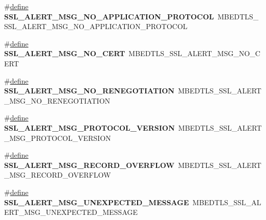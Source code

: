 \begin{DoxyCompactItemize}
\mbox{\label{compat-1_83_8h_aa2e1d7e2cad0ef4fa4b2bf05b548d69c}} 
\#\hyperlink{structdefine}{define} {\bfseries S\+S\+L\+\_\+\+A\+L\+E\+R\+T\+\_\+\+M\+S\+G\+\_\+\+N\+O\+\_\+\+A\+P\+P\+L\+I\+C\+A\+T\+I\+O\+N\+\_\+\+P\+R\+O\+T\+O\+C\+OL}~M\+B\+E\+D\+T\+L\+S\+\_\+\+S\+S\+L\+\_\+\+A\+L\+E\+R\+T\+\_\+\+M\+S\+G\+\_\+\+N\+O\+\_\+\+A\+P\+P\+L\+I\+C\+A\+T\+I\+O\+N\+\_\+\+P\+R\+O\+T\+O\+C\+OL
\item 
\mbox{\label{compat-1_83_8h_aa39058a5209b2dc80ce6ed78df88ac1e}} 
\#\hyperlink{structdefine}{define} {\bfseries S\+S\+L\+\_\+\+A\+L\+E\+R\+T\+\_\+\+M\+S\+G\+\_\+\+N\+O\+\_\+\+C\+E\+RT}~M\+B\+E\+D\+T\+L\+S\+\_\+\+S\+S\+L\+\_\+\+A\+L\+E\+R\+T\+\_\+\+M\+S\+G\+\_\+\+N\+O\+\_\+\+C\+E\+RT
\item 
\mbox{\label{compat-1_83_8h_a575935e3c2a919ac2600e9f4f1ea27bb}} 
\#\hyperlink{structdefine}{define} {\bfseries S\+S\+L\+\_\+\+A\+L\+E\+R\+T\+\_\+\+M\+S\+G\+\_\+\+N\+O\+\_\+\+R\+E\+N\+E\+G\+O\+T\+I\+A\+T\+I\+ON}~M\+B\+E\+D\+T\+L\+S\+\_\+\+S\+S\+L\+\_\+\+A\+L\+E\+R\+T\+\_\+\+M\+S\+G\+\_\+\+N\+O\+\_\+\+R\+E\+N\+E\+G\+O\+T\+I\+A\+T\+I\+ON
\item 
\mbox{\label{compat-1_83_8h_a368e71bd5a946294a83aa59d121a5680}} 
\#\hyperlink{structdefine}{define} {\bfseries S\+S\+L\+\_\+\+A\+L\+E\+R\+T\+\_\+\+M\+S\+G\+\_\+\+P\+R\+O\+T\+O\+C\+O\+L\+\_\+\+V\+E\+R\+S\+I\+ON}~M\+B\+E\+D\+T\+L\+S\+\_\+\+S\+S\+L\+\_\+\+A\+L\+E\+R\+T\+\_\+\+M\+S\+G\+\_\+\+P\+R\+O\+T\+O\+C\+O\+L\+\_\+\+V\+E\+R\+S\+I\+ON
\item 
\mbox{\label{compat-1_83_8h_abafde3870ba4e25a83e8f73fa8c32246}} 
\#\hyperlink{structdefine}{define} {\bfseries S\+S\+L\+\_\+\+A\+L\+E\+R\+T\+\_\+\+M\+S\+G\+\_\+\+R\+E\+C\+O\+R\+D\+\_\+\+O\+V\+E\+R\+F\+L\+OW}~M\+B\+E\+D\+T\+L\+S\+\_\+\+S\+S\+L\+\_\+\+A\+L\+E\+R\+T\+\_\+\+M\+S\+G\+\_\+\+R\+E\+C\+O\+R\+D\+\_\+\+O\+V\+E\+R\+F\+L\+OW
\item 
\mbox{\label{compat-1_83_8h_a39c9318d0549bab6c227ecd0d70f035c}} 
\#\hyperlink{structdefine}{define} {\bfseries S\+S\+L\+\_\+\+A\+L\+E\+R\+T\+\_\+\+M\+S\+G\+\_\+\+U\+N\+E\+X\+P\+E\+C\+T\+E\+D\+\_\+\+M\+E\+S\+S\+A\+GE}~M\+B\+E\+D\+T\+L\+S\+\_\+\+S\+S\+L\+\_\+\+A\+L\+E\+R\+T\+\_\+\+M\+S\+G\+\_\+\+U\+N\+E\+X\+P\+E\+C\+T\+E\+D\+\_\+\+M\+E\+S\+S\+A\+GE

\end{DoxyCompactItemize}
